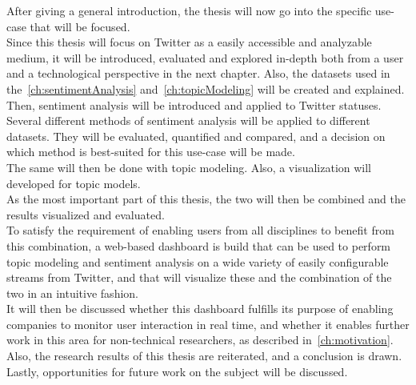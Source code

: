 After giving a general introduction, the thesis will now go into the specific use-case that will be focused.\\
Since this thesis will focus on Twitter as a easily accessible and analyzable medium,
it will be introduced, evaluated and explored in-depth both from a user and a technological perspective in the next chapter.
Also, the datasets used in the~\cref{ch:sentimentAnalysis} and~\cref{ch:topicModeling} will be created and explained.\\
Then, sentiment analysis will be introduced and applied to Twitter statuses.
Several different methods of sentiment analysis will be applied to different datasets.
They will be evaluated, quantified and compared, and a decision on which method is best-suited for this use-case will be made.\\
The same will then be done with topic modeling.
Also, a visualization will developed for topic models.\\
As the most important part of this thesis, the two will then be combined and the results visualized and evaluated.\\
To satisfy the requirement of enabling users from all disciplines to benefit from this combination,
a web-based dashboard is build that can be used to perform topic modeling and sentiment analysis on a
wide variety of easily configurable streams from Twitter, and that will visualize these and the combination of the two in an intuitive fashion.\\
It will then be discussed whether this dashboard fulfills its purpose of enabling companies to monitor user interaction in real time,
and whether it enables further work in this area for non-technical researchers, as described in~\cref{ch:motivation}.
Also, the research results of this thesis are reiterated, and a conclusion is drawn.
Lastly, opportunities for future work on the subject will be discussed.
